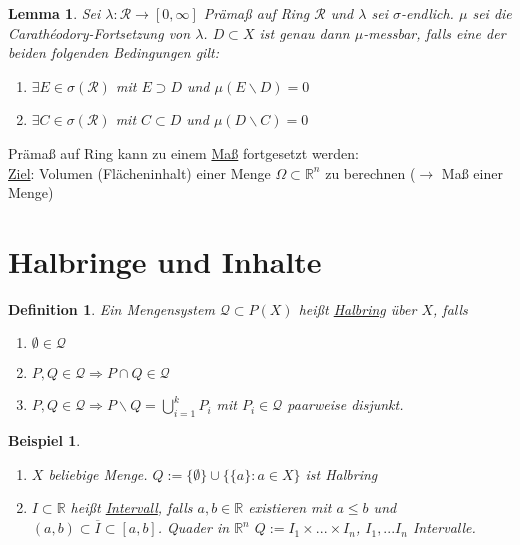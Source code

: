 \documentclass[11pt]{memoir}
\theoremstyle{changebreak}
\newtheorem{Definition}{Definition}[chapter]
\newtheorem{Beispiel}{Beispiel}[chapter]
\newtheorem{Lemma}{Lemma}[chapter]
\newcommand{\cara}{Carathéodory-Fortsetzung}
\begin{document}
\begin{Lemma}
Sei $\lambda: \mathscr R \rightarrow [0, \infty]$ Prämaß auf Ring $\mathscr R$ und $\lambda$ sei $\sigma$-endlich. $\mu$ sei die \cara{} von $\lambda$. $D \subset X$ ist genau dann $\mu$-messbar, falls eine der beiden folgenden Bedingungen gilt:
\begin{enumerate}
	\item $\exists E \in \sigma(\mathscr R)$ mit $E \supset D$ und $\mu(E \backslash D) = 0$
	\item $\exists C \in \sigma(\mathscr R)$ mit $C \subset D$ und $\mu(D \backslash C) = 0$
\end{enumerate}
\end{Lemma}

Prämaß auf Ring kann zu einem \underline{Maß} fortgesetzt werden: \\
\underline{Ziel}: Volumen (Flächeninhalt) einer Menge $\Omega \subset \mathbb R^n$ zu berechnen ($\rightarrow$ Maß einer Menge)


\section{Halbringe und Inhalte}
\begin{Definition}
Ein Mengensystem $\mathscr Q \subset P(X)$ heißt \underline{Halbring} über $X$, falls
\begin{enumerate}
	\item $\emptyset \in \mathscr Q$
	\item $P, Q \in \mathscr Q \Rightarrow P \cap Q \in \mathscr Q$
	\item $P, Q \in \mathscr Q \Rightarrow P \backslash Q = \bigcup\limits_{i=1}^k P_i$ mit $P_i \in \mathscr Q$ paarweise disjunkt.
\end{enumerate}
\end{Definition}

\begin{Beispiel}
\begin{enumerate}
	\item $X$ beliebige Menge. $Q := \{\emptyset\} \cup \{\{a\}:  a \in X\}$ ist Halbring
	\item $I \subset \mathbb R$ heißt \underline{Intervall}, falls $a, b \in \mathbb R$ existieren mit $a \leq b$ und $(a, b) \subset \overline{I} \subset [a, b]$. Quader in $\mathbb R^n$ $ Q:= I_1 \times ... \times I_n$,  $I_1, ... I_n$ Intervalle.
\end{enumerate}
\end{Beispiel}
\end{document}
